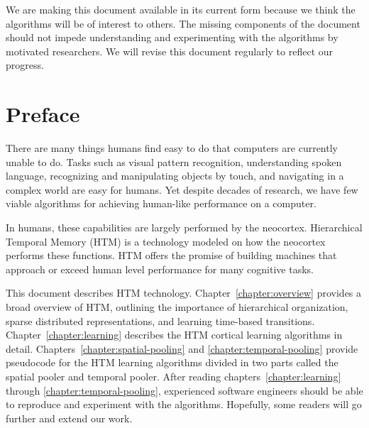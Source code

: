 \documentclass{report}
\begin{document}
We are making this document available in its current form because we
think the algorithms will be of interest to others. The missing
components of the document should not impede understanding and
experimenting with the algorithms by motivated researchers. We will
revise this document regularly to reflect our progress.

\tableofcontents


\chapter*{Preface}

There are many things humans find easy to do that computers are
currently unable to do. Tasks such as visual pattern recognition,
understanding spoken language, recognizing and manipulating objects by
touch, and navigating in a complex world are easy for humans. Yet
despite decades of research, we have few viable algorithms for
achieving human-like performance on a computer.

In humans, these capabilities are largely performed by the
neocortex. Hierarchical Temporal Memory (HTM) is a technology modeled
on how the neocortex performs these functions. HTM offers the promise
of building machines that approach or exceed human level performance
for many cognitive tasks.

This document describes HTM technology. Chapter~\ref{chapter:overview}
provides a broad overview of HTM, outlining the importance of
hierarchical organization, sparse distributed representations, and
learning time-based transitions. Chapter~\ref{chapter:learning}
describes the HTM cortical learning algorithms in
detail. Chapters~\ref{chapter:spatial-pooling} and
\ref{chapter:temporal-pooling} provide pseudocode for the HTM learning
algorithms divided in two parts called the spatial pooler and temporal
pooler. After reading chapters~\ref{chapter:learning} through
\ref{chapter:temporal-pooling}, experienced software engineers should
be able to reproduce and experiment with the algorithms. Hopefully,
some readers will go further and extend our work.
\end{document}

